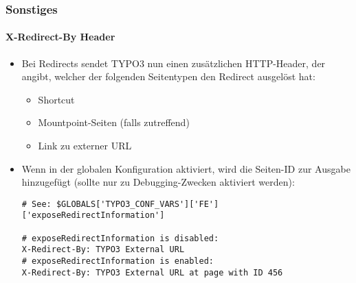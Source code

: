 %

\begin{frame}[fragile]
	\frametitle{Sonstiges}
	\framesubtitle{X-Redirect-By Header}


	\begin{itemize}
		\item Bei Redirects sendet TYPO3 nun einen zusätzlichen HTTP-Header,
			der angibt, welcher der folgenden Seitentypen den Redirect ausgelöst hat:
			\begin{itemize}\small
				\item Shortcut
				\item Mountpoint-Seiten (falls zutreffend)
				\item Link zu externer URL
			\end{itemize}\normalsize
		\item Wenn in der globalen Konfiguration aktiviert, wird die Seiten-ID zur Ausgabe hinzugefügt
			(sollte nur zu Debugging-Zwecken aktiviert werden):
\begin{lstlisting}
# See: $GLOBALS['TYPO3_CONF_VARS']['FE']['exposeRedirectInformation']

# exposeRedirectInformation is disabled:
X-Redirect-By: TYPO3 External URL
# exposeRedirectInformation is enabled:
X-Redirect-By: TYPO3 External URL at page with ID 456
\end{lstlisting}

	\end{itemize}

\end{frame}

